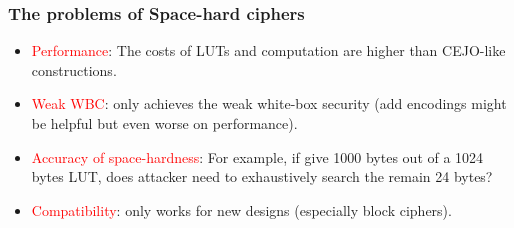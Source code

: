 \documentclass{beamer}
\begin{document}
\frame
{
\frametitle{The problems of Space-hard ciphers}
\begin{itemize}
\item \textcolor{red}{Performance}: The costs of LUTs and computation are higher than CEJO-like constructions.\newline

\item \textcolor{red}{Weak WBC}: only achieves the weak white-box security (add encodings might be helpful but even worse on performance).

\item \textcolor{red}{Accuracy of space-hardness}: For example, if give 1000 bytes out of a 1024 bytes LUT, does attacker need to exhaustively search the remain 24 bytes?

\item \textcolor{red}{Compatibility}: only works for new designs (especially block ciphers).
\end{itemize}
}

\end{document}
